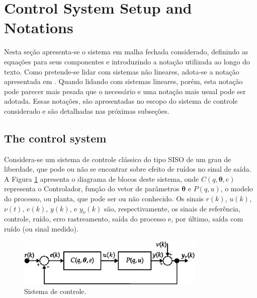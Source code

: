 \section{Control System Setup and Notations}%
\label{sec:system_setup_}

Nesta seção apresenta-se o sistema em malha fechada considerado, definindo as equações para seus componentes e introduzindo a notação utilizada ao longo do texto. Como pretende-se lidar com sistemas não lineares, adota-se a notação apresentada em \cite{campi2006}. Quando lidando com sistemas lineares, porém, esta notação pode parecer mais pesada que o necessário e uma notação mais usual pode ser adotada. Essas notações, são apresentadas no escopo do sistema de controle considerado e são detalhadas nas próximas subseções.

\subsection{The control system}%
\label{sub:o_sistema_de_controle}

Considera-se um sistema de controle clássico do tipo SISO de um grau de liberdade, que pode ou não se encontrar sobre efeito de ruídos no sinal de saída. A Figura \ref{fig:diagrama_MF} apresenta o diagrama de blocos deste sistema, onde $C(q, \bm{\theta}, e)$ representa o Controlador, função do vetor de parâmetros $\bm{\theta}$ e $P(q,u)$, o modelo do processo, ou planta, que pode ser ou não conhecido. Os sinais $r(k)$,
$u(k)$, $\nu(t)$, $e(k)$, $y(k)$, e $y_\nu(k)$ são, respectivamente, os sinais de referência, controle, ruído, erro rastreamento, saída do processo e, por último, saída com ruído (ou sinal medido).

\begin{figure}[htpb] 
   \centering
   \includegraphics[width=0.8\textwidth]{Figs/diagrama_mf.eps}
   \caption{Sistema de controle.}
   \label{fig:diagrama_MF}
\end{figure}

